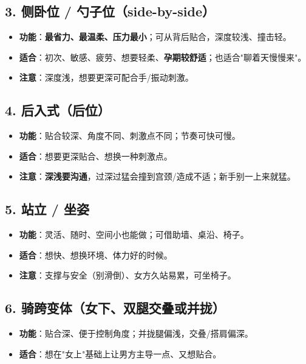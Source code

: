 \documentclass[12pt,UTF8,openany]{ctexbook}
\begin{document}
\subsection*{3. 侧卧位 / 勺子位（side-by-side）}
\begin{itemize}[leftmargin=2em,itemsep=0.3em]
  \item \textbf{功能}：\textbf{最省力、最温柔、压力最小}；可从背后贴合，深度较浅、撞击轻。
  \item \textbf{适合}：初次、敏感、疲劳、想要轻柔、\textbf{孕期较舒适}；也适合"聊着天慢慢来"。
  \item \textbf{注意}：深度浅，想要更深可配合手/振动刺激。
\end{itemize}

\subsection*{4. 后入式（后位）}
\begin{itemize}[leftmargin=2em,itemsep=0.3em]
  \item \textbf{功能}：贴合较深、角度不同、刺激点不同；节奏可快可慢。
  \item \textbf{适合}：想要更深贴合、想换一种刺激点。
  \item \textbf{注意}：\textbf{深浅要沟通}，过深过猛会撞到宫颈/造成不适；新手别一上来就猛。
\end{itemize}

\subsection*{5. 站立 / 坐姿}
\begin{itemize}[leftmargin=2em,itemsep=0.3em]
  \item \textbf{功能}：灵活、随时、空间小也能做；可借助墙、桌沿、椅子。
  \item \textbf{适合}：想快、想换环境、体力好的时候。
  \item \textbf{注意}：支撑与安全（别滑倒）、女方久站易累，可坐椅子。
\end{itemize}

\subsection*{6. 骑跨变体（女下、双腿交叠或并拢）}
\begin{itemize}[leftmargin=2em,itemsep=0.3em]
  \item \textbf{功能}：贴合深、便于控制角度；并拢腿偏浅，交叠/搭肩偏深。
  \item \textbf{适合}：想在"女上"基础上让男方主导一点、又想贴合。
\end{itemize}
\end{document}

